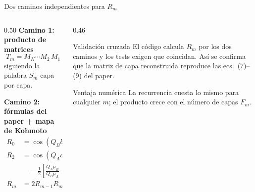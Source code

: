 \documentclass[aspectratio=169,10pt]{beamer}
\begin{document}
\begin{frame}{Dos caminos independientes para $R_m$}
  \begin{columns}[T]
    \begin{column}{0.50\textwidth}
      \textbf{Camino 1: producto de matrices}
      \[ T_m = M_N \cdots M_2\,M_1 \]
      siguiendo la palabra $S_m$ capa por capa.
      \vspace{0.6em}

      \textbf{Camino 2: fórmulas del paper + mapa de Kohmoto}
      \begin{align*}
        R_0 &= \cos(Q_B b), \qquad R_1 = \cos(Q_A a) \\
        R_2 &= \cos(Q_A a)\cos(Q_B b) \\
            &\quad - \tfrac12\!\left[\tfrac{Q_A\mu_B}{Q_B\mu_A} + \tfrac{Q_B\mu_A}{Q_A\mu_B}\right]\sin(Q_A a)\sin(Q_B b) \\
        R_m &= 2R_{m-1}R_{m-2} - R_{m-3}
      \end{align*}
    \end{column}
    \begin{column}{0.46\textwidth}
      \begin{exampleblock}{Validación cruzada}
        El código calcula $R_m$ por los dos caminos y los tests exigen que coincidan.
        Así se confirma que la matriz de capa reconstruida reproduce las ecs.~(7)--(9) del paper.
      \end{exampleblock}
      \begin{block}{Ventaja numérica}
        La recurrencia cuesta lo mismo para cualquier $m$; el producto crece con el número de capas $F_m$.
      \end{block}
    \end{column}
  \end{columns}
\end{frame}
\end{document}
